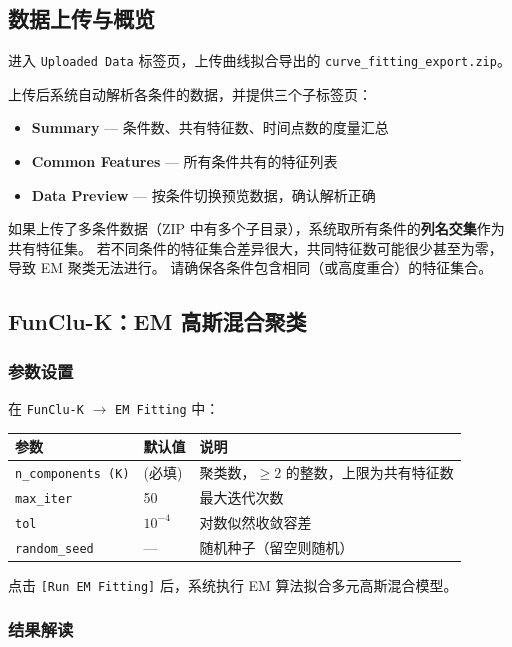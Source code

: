 \documentclass[12pt,a4paper]{ctexart}
\makeatletter
\newcommand{\btn}[1]{\texttt{[#1]}}
\newcommand{\tab}[1]{\texttt{#1}}
\newcommand{\file}[1]{\texttt{#1}}
\newcommand{\param}[1]{\texttt{#1}}
\newcommand{\paramtable}[1]{%
    \begin{center}
    \small
    \begin{tabular}{@{}llp{5.5cm}@{}}
    \toprule
    \textbf{参数} & \textbf{默认值} & \textbf{说明} \\
    \midrule
    #1
    \bottomrule
    \end{tabular}
    \end{center}
}
\makeatother
\begin{document}
\subsection{数据上传与概览}

进入 \tab{Uploaded Data} 标签页，上传曲线拟合导出的 \file{curve\_fitting\_export.zip}。

上传后系统自动解析各条件的数据，并提供三个子标签页：

\begin{itemize}[leftmargin=*]
    \item \textbf{Summary} --- 条件数、共有特征数、时间点数的度量汇总
    \item \textbf{Common Features} --- 所有条件共有的特征列表
    \item \textbf{Data Preview} --- 按条件切换预览数据，确认解析正确
\end{itemize}

\begin{warnbox}[多条件数据要求]
    如果上传了多条件数据（ZIP 中有多个子目录），系统取所有条件的\textbf{列名交集}作为共有特征集。
    若不同条件的特征集合差异很大，共同特征数可能很少甚至为零，导致 EM 聚类无法进行。
    请确保各条件包含相同（或高度重合）的特征集合。
\end{warnbox}

\subsection{FunClu-K：EM 高斯混合聚类}

\subsubsection{参数设置}

在 \tab{FunClu-K} $\rightarrow$ \tab{EM Fitting} 中：

\paramtable{
    \param{n\_components (K)} & (必填) & 聚类数，$\geq 2$ 的整数，上限为共有特征数\\
    \param{max\_iter} & 50 & 最大迭代次数\\
    \param{tol} & $10^{-4}$ & 对数似然收敛容差\\
    \param{random\_seed} & --- & 随机种子（留空则随机）\\
}

点击 \btn{Run EM Fitting} 后，系统执行 EM 算法拟合多元高斯混合模型。

\subsubsection{结果解读}
\end{document}
